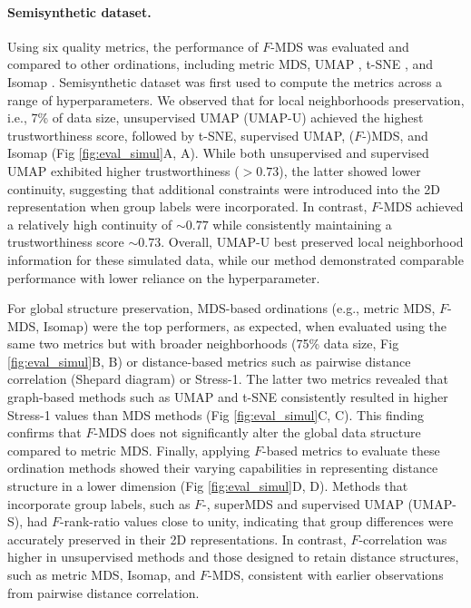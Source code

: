 \documentclass[10pt,letterpaper]{article}
\newcommand{\1}{{\rm 1}\kern-0.24em{\rm I}}
\begin{document}
\paragraph*{Semisynthetic dataset.} \label{sec:eval_sim}
Using six quality metrics, the performance of $F$-MDS was evaluated and compared to other ordinations, including metric MDS, 
UMAP \cite{McInnes18}, t-SNE \cite{maaten08}, and Isomap \cite{tenenbaum00}. Semisynthetic dataset was first used to compute the metrics across a range of hyperparameters. We observed that for local neighborhoods preservation, i.e., 7\% of data size, unsupervised UMAP (UMAP-U) achieved the highest trustworthiness score, followed by t-SNE, supervised UMAP, ($F$-)MDS, and Isomap (Fig \ref{fig:eval_simul}A, A). While both unsupervised and supervised UMAP exhibited higher trustworthiness ($>0.73$), the latter showed lower continuity, suggesting that additional constraints were introduced into the 2D representation when group labels were incorporated. In contrast, $F$-MDS achieved a relatively high continuity of $\sim\!0.77$ while consistently maintaining a trustworthiness score $\sim\!0.73$. Overall, UMAP-U best preserved local neighborhood information for these simulated data, while our method demonstrated comparable performance with lower reliance on the hyperparameter. 

For global structure preservation, MDS-based ordinations (e.g., metric MDS, $F$-MDS, Isomap) were the top performers, as expected, when evaluated using the same two metrics but with broader neighborhoods (75\% data size, Fig \ref{fig:eval_simul}B, B) or distance-based metrics such as pairwise distance correlation (Shepard diagram) or Stress-1. The latter two metrics revealed that graph-based methods such as UMAP and t-SNE consistently resulted in higher Stress-1 values than MDS methods (Fig \ref{fig:eval_simul}C, C). This finding confirms that $F$-MDS does not significantly alter the global data structure compared to metric MDS. Finally, applying $F$-based metrics to evaluate these ordination methods showed their varying capabilities in representing distance structure in a lower dimension (Fig \ref{fig:eval_simul}D, D). Methods that incorporate group labels, such as $F$-, superMDS and supervised UMAP (UMAP-S), had $F$-rank-ratio values close to unity, indicating that group differences were accurately preserved in their 2D representations. In contrast, $F$-correlation was higher in unsupervised methods and those designed to retain distance structures, such as metric MDS, Isomap, and $F$-MDS, consistent with earlier observations from pairwise distance correlation. 
\end{document}
